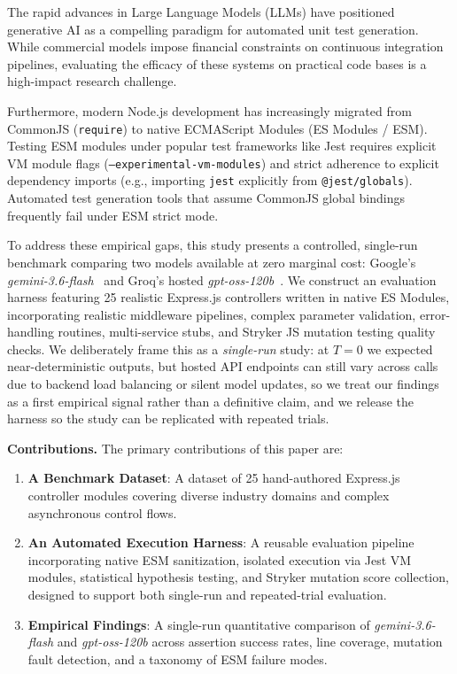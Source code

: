 \documentclass[conference]{IEEEtran}
\begin{document}
The rapid advances in Large Language Models (LLMs) have positioned generative AI as a compelling paradigm for automated unit test generation. While commercial models impose financial constraints on continuous integration pipelines, evaluating the efficacy of these systems on practical code bases is a high-impact research challenge.

Furthermore, modern Node.js development has increasingly migrated from CommonJS (\texttt{require}) to native ECMAScript Modules (ES Modules / ESM). Testing ESM modules under popular test frameworks like Jest requires explicit VM module flags (\texttt{--experimental-vm-modules}) and strict adherence to explicit dependency imports (e.g., importing \texttt{jest} explicitly from \texttt{@jest/globals}). Automated test generation tools that assume CommonJS global bindings frequently fail under ESM strict mode.

To address these empirical gaps, this study presents a controlled, single-run benchmark comparing two models available at zero marginal cost: Google's \textit{gemini-3.6-flash}~\cite{gemini36flashcard} and Groq's hosted \textit{gpt-oss-120b}~\cite{openaiopts120b}. We construct an evaluation harness featuring 25 realistic Express.js controllers written in native ES Modules, incorporating realistic middleware pipelines, complex parameter validation, error-handling routines, multi-service stubs, and Stryker JS mutation testing quality checks. We deliberately frame this as a \emph{single-run} study: at $T=0$ we expected near-deterministic outputs, but hosted API endpoints can still vary across calls due to backend load balancing or silent model updates, so we treat our findings as a first empirical signal rather than a definitive claim, and we release the harness so the study can be replicated with repeated trials.

\textbf{Contributions.} The primary contributions of this paper are:
\begin{enumerate}
    \item \textbf{A Benchmark Dataset}: A dataset of 25 hand-authored Express.js controller modules covering diverse industry domains and complex asynchronous control flows.
    \item \textbf{An Automated Execution Harness}: A reusable evaluation pipeline incorporating native ESM sanitization, isolated execution via Jest VM modules, statistical hypothesis testing, and Stryker mutation score collection, designed to support both single-run and repeated-trial evaluation.
    \item \textbf{Empirical Findings}: A single-run quantitative comparison of \textit{gemini-3.6-flash} and \textit{gpt-oss-120b} across assertion success rates, line coverage, mutation fault detection, and a taxonomy of ESM failure modes.
\end{enumerate}
\end{document}
